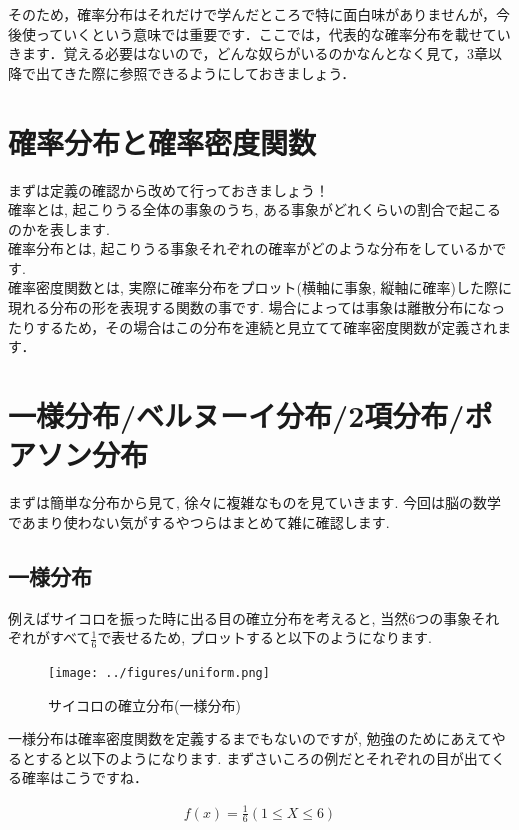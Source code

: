 \documentclass[11pt,a4paper,uplatex]{ujreport} 	%
\begin{document}
そのため，確率分布はそれだけで学んだところで特に面白味がありませんが，今後使っていくという意味では重要です．ここでは，代表的な確率分布を載せていきます．覚える必要はないので，どんな奴らがいるのかなんとなく見て，3章以降で出てきた際に参照できるようにしておきましょう．
\section{確率分布と確率密度関数}
まずは定義の確認から改めて行っておきましょう！\\

確率とは, 起こりうる全体の事象のうち, ある事象がどれくらいの割合で起こるのかを表します. \\

確率分布とは, 起こりうる事象それぞれの確率がどのような分布をしているかです. \\

確率密度関数とは, 実際に確率分布をプロット(横軸に事象, 縦軸に確率)した際に現れる分布の形を表現する関数の事です. 場合によっては事象は離散分布になったりするため，その場合はこの分布を連続と見立てて確率密度関数が定義されます．\\

\section{一様分布/ベルヌーイ分布/2項分布/ポアソン分布}
まずは簡単な分布から見て, 徐々に複雑なものを見ていきます. 今回は脳の数学であまり使わない気がするやつらはまとめて雑に確認します.\\
\subsection{一様分布}
例えばサイコロを振った時に出る目の確立分布を考えると, 当然6つの事象それぞれがすべて$\frac{1}{6}$で表せるため, プロットすると以下のようになります.\\
\begin{figure}[H]
\label{im:uniform}
  \centering
  \texttt{[image: ../figures/uniform.png]}
  \caption{サイコロの確立分布(一様分布)}
\end{figure}

一様分布は確率密度関数を定義するまでもないのですが, 勉強のためにあえてやるとすると以下のようになります. まずさいころの例だとそれぞれの目が出てくる確率はこうですね．

\begin{align}
\label{eq:uniform}
f(x) = \frac{1}{6} (1 \leq X \leq 6)
\end{align}
\end{document}
